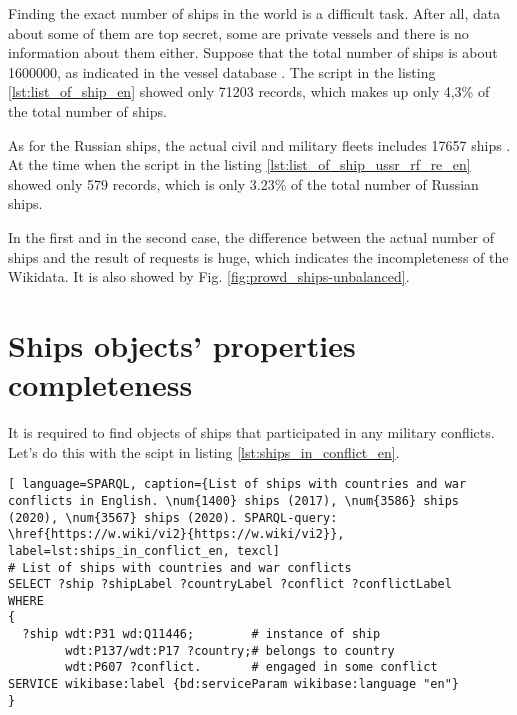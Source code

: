Finding the exact number of ships in the world is a difficult task. After all, data about some of them are top secret, some are private vessels and there is no information about them either. Suppose that the total number of ships is about \num{1600000}, as indicated in the vessel database . The script in the listing \ref{lst:list_of_ship_en} showed only \num{71203} records, which makes up only 4,3\% of the total number of ships. 

As for the Russian ships, the actual civil and military fleets includes \num{17657} ships . At the time when the script in the listing \ref{lst:list_of_ship_ussr_rf_re_en} showed only 579 records, which is only 3.23\% of the total number of Russian ships. 

In the first and in the second case, the difference between the actual number of ships and the result of requests is huge, which indicates the incompleteness of the Wikidata. It is also showed by Fig. \ref{fig:prowd_ships-unbalanced}.


\section{Ships objects' properties completeness}

It is required to find objects of ships that participated in any military conflicts. Let's do this with the scipt in listing \ref{lst:ships_in_conflict_en}.

\begin{lstlisting}[ language=SPARQL, caption={List of ships with countries and war conflicts in English. \num{1400} ships (2017), \num{3586} ships (2020), \num{3567} ships (2020). SPARQL-query: \href{https://w.wiki/vi2}{https://w.wiki/vi2}}, label=lst:ships_in_conflict_en, texcl]
# List of ships with countries and war conflicts
SELECT ?ship ?shipLabel ?countryLabel ?conflict ?conflictLabel
WHERE
{
  ?ship wdt:P31 wd:Q11446;        # instance of ship
        wdt:P137/wdt:P17 ?country;# belongs to country
        wdt:P607 ?conflict.       # engaged in some conflict
SERVICE wikibase:label {bd:serviceParam wikibase:language "en"}
}
\end{lstlisting}


